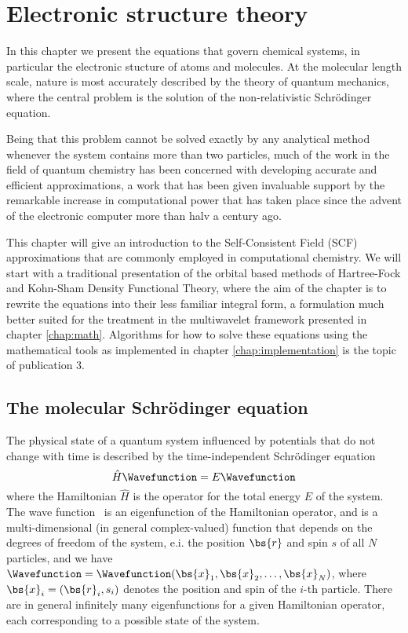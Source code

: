 \chapter{Electronic structure theory}
In this chapter we present the equations that govern chemical systems, in particular
the electronic stucture of atoms and molecules. At the molecular length scale, nature
is most accurately described by the theory of quantum mechanics, where the central
problem is the solution of the non-relativistic Schr\"{o}dinger equation.

Being that this problem cannot be solved exactly by any analytical method whenever
the system contains more than two particles, much of the work in the field of quantum
chemistry has been concerned with developing accurate and efficient approximations,
a work that has been given invaluable support by the remarkable increase in 
computational power that has taken place since the advent of the electronic computer 
more than halv a century ago.

This chapter will give an introduction to the Self-Consistent Field (SCF) approximations 
that are commonly employed in computational chemistry. We will start with a traditional 
presentation of the orbital based methods of Hartree-Fock and Kohn-Sham Density Functional 
Theory, where the aim of the chapter is to rewrite the equations into their less familiar 
integral form, a formulation much better suited for the treatment in the multiwavelet 
framework presented in chapter \ref{chap:math}. Algorithms for how to solve these equations 
using the mathematical tools as implemented in chapter \ref{chap:implementation} is the 
topic of publication 3.

\section{The molecular Schr\"{o}dinger equation}\label{sec:schrodinger}
The physical state of a quantum system influenced by potentials that do not change
with time is described by the time-independent Schr\"{o}dinger equation 
\begin{equation}
    \label{eq:mol_schr}
    \hat{H}\Wavefunction = E\Wavefunction
\end{equation}
where the Hamiltonian $\hat{H}$ is the operator for the total energy $E$ of the system.
The wave function \Wavefunction\ is an eigenfunction of the Hamiltonian operator, 
and is a multi-dimensional (in general complex-valued) function that depends on the 
degrees of freedom of the system, e.i. the position $\bs{r}$ and spin $s$ of all $N$ 
particles, and we have $\Wavefunction=\Wavefunction(\bs{x}_1,\bs{x}_2,\dots,\bs{x}_N)$, 
where $\bs{x}_i=(\bs{r}_i,s_i)$ denotes the position and spin of the $i$-th particle. 
There are in general infinitely many eigenfunctions for a given Hamiltonian operator,
each corresponding to a possible state of the system. 

